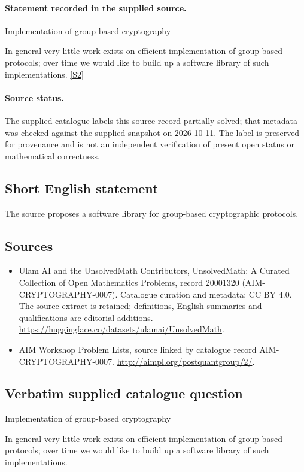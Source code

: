 \documentclass[11pt]{article}
\begin{document}
\paragraph{Statement recorded in the supplied source.}
Implementation of group-based cryptography

In general very little work exists on efficient implementation of group-based protocols; over time we would like to build up a software library of such implementations. \href{http://aimpl.org/postquantgroup/2/}{[S2]}
\paragraph{Source status.}
The supplied catalogue labels this source record partially solved; that metadata was checked against the supplied snapshot on 2026-10-11. The label is preserved for provenance and is not an independent verification of present open status or mathematical correctness.
\subsection{Short English statement}
The source proposes a software library for group-based cryptographic protocols.
\subsection{Sources}
\begin{itemize}
\item[S1] Ulam AI and the UnsolvedMath Contributors, UnsolvedMath: A Curated Collection of Open Mathematics Problems, record 20001320 (AIM-CRYPTOGRAPHY-0007). Catalogue curation and metadata: CC BY 4.0. The source extract is retained; definitions, English summaries and qualifications are editorial additions.
\url{https://huggingface.co/datasets/ulamai/UnsolvedMath}.
\item[S2] AIM Workshop Problem Lists, source linked by catalogue record AIM-CRYPTOGRAPHY-0007.
\url{http://aimpl.org/postquantgroup/2/}.
\end{itemize}
\subsection{Verbatim supplied catalogue question}
Implementation of group-based cryptography

In general very little work exists on efficient implementation of group-based protocols; over time we would like to build up a software library of such implementations.
\end{document}

